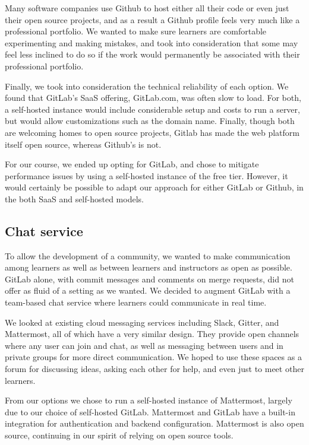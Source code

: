 \documentclass[12pt,twoside,vi]{mitthesis}
\begin{document}
Many software companies use Github to host either all their code or even just their open source projects, and as a result a Github profile feels very much like a professional portfolio. We wanted to make sure learners are comfortable experimenting and making mistakes, and took into consideration that some may feel less inclined to do so if the work would permanently be associated with their professional portfolio. 

Finally, we took into consideration the technical reliability of each option. We found that GitLab's SaaS offering, GitLab.com, was often slow to load. For both, a self-hosted instance would include considerable setup and costs to run a server, but would allow customizations such as the domain name. Finally, though both are welcoming homes to open source projects, Gitlab has made the web platform itself open source, whereas Github's is not.

For our course, we ended up opting for GitLab, and chose to mitigate performance issues by using a self-hosted instance of the free tier. However, it would certainly be possible to adapt our approach for either GitLab or Github, in the both SaaS and self-hosted models.

\subsection{Chat service}

To allow the development of a community, we wanted to make communication among learners as well as between learners and instructors as open as possible. GitLab alone, with commit messages and comments on merge requests, did not offer as fluid of a setting as we wanted. We decided to augment GitLab with a team-based chat service where learners could communicate in real time.

We looked at existing cloud messaging services including Slack, Gitter, and Mattermost, all of which have a very similar design. They provide open channels where any user can join and chat, as well as messaging between users and in private groups for more direct communication. We hoped to use these spaces as a forum for discussing ideas, asking each other for help, and even just to meet other learners.

From our options we chose to run a self-hosted instance of Mattermost, largely due to our choice of self-hosted GitLab. Mattermost and GitLab have a built-in integration for authentication and backend configuration. Mattermost is also open source, continuing in our spirit of relying on open source tools.
\end{document}
